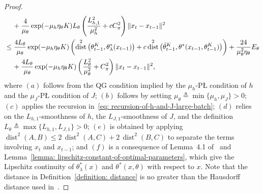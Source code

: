 \documentclass{article}
\theoremstyle{plain}
\theoremstyle{definition}
\theoremstyle{remark}
\DeclareMathOperator{\dist}{dist}
\def\bydef{\triangleq}
\begin{document}
\begin{proof}
\begin{align}
         & \quad \, + \frac{4}{\mu_\theta} \exp( - \mu_h \eta_\theta K ) L_{\theta} \left( \frac{L_{h,1}^2}{\mu^2_h}  + c C_{\pi}^2  \right) \|x_{t} - x_{t-1} \|^2 \\
         & \leq  \frac{4 L_{\theta}}{\mu_\theta} \exp( - \mu_h \eta_\theta K ) \left(\dist^2\left(\theta_{t-1}^K, \theta_\lambda^*(x_{t-1}) \right)+ c  \dist^2\left(\tilde{\theta}_{t-1}^K, \theta^*(x_{t-1},\theta_{t-1}^K)\right) \right) + \frac{24}{\mu_\theta^2 \eta_\theta} E_\theta \notag \\
         & \quad \, + \frac{4L_{\theta}}{\mu_\theta} \exp( - \mu_h \eta_\theta K )  \left( \frac{L_{\theta}^2}{\mu^2_\theta}  +  C_{\pi}^2  \right) \|x_{t} - x_{t-1} \|^2 ,
\end{align}
where $(a)$ follows from the QG condition implied by the $\mu_h$-P{\L}
condition of $h$ and the $\mu_J$-P{\L} condition of $J$; $(b)$ follows by setting $\mu_\theta \bydef \min\{\mu_h,\mu_J\}>0$; 
$(c)$ applies the recursion in~\eqref{eq: recursion-of-h-and-J-large-batch};
$(d)$ relies on the $L_{h,1}$-smoothness of $h$, the $L_{J,1}$-smoothness of
$J$, and the definition
$L_{\theta} \bydef \max\{L_{h,1},L_{J,1}\}>0$;
$(e)$ is obtained by applying $\dist^2(A,B) \le 2\,\dist^2(A,C) + 2\,\dist^2(B,C)$ to separate the terms involving $x_t$ and $x_{t-1}$; 
and $(f)$ is a consequence of Lemma~4.1 of~\citet{chen2024finding} and
Lemma~\ref{lemma: lipschitz-constant-of-optimal-parameters}, which give the
Lipschitz continuity of $\theta_\lambda^*(x)$ and $\theta^*(x,\theta)$ with
respect to $x$. Note that the distance in
Definition~\ref{definition: distance} is no greater than the Hausdorff
distance used in~\citet{chen2024finding}.


\end{proof}
\end{document}
